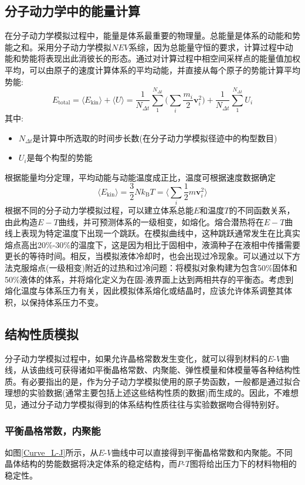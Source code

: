 \subsection{分子动力学中的能量计算}
在分子动力学模拟过程中，能量是体系最重要的物理量。总能量是体系的动能和势能之和。采用分子动力学模拟$NEV$系综，因为总能量守恒的要求，计算过程中动能和势能将表现出此消彼长的形态。通过对计算过程中相空间采样点的能量值加权平均，可以由原子的速度计算体系的平均动能，并直接从每个原子的势能计算平均势能:
\begin{equation}
	E_{\mathrm{total}}=\langle E_{\mathrm{kin}}\rangle+\langle U\rangle=\dfrac1{N_{\Delta t}}\sum_1^{N_{\Delta t}}\bigg(\sum_i\dfrac{m_i}2\mathbf{v}_i^2\bigg)+\dfrac1{N_{\Delta t}}\sum_1^{N_{\Delta t}}U_i
	\label{eq:MD_Enerty_tot}
\end{equation}
其中:
\begin{itemize}
	\item $N_{\Delta t}$是计算中所选取的时间步长数(在分子动力学模拟径迹中的构型数目)
	\item $U_i$是每个构型的势能
\end{itemize}
根据能量均分定理，平均动能与动能温度成正比，温度可根据速度数据确定
\begin{equation}
	\langle E_{\mathrm{kin}}\rangle=\dfrac32Nk_{\mathrm{B}}T=\bigg\langle\sum_i\dfrac12m\mathbf{v}_i^2\bigg\rangle
	\label{eq:Energy_T}
\end{equation}
根据不同的分子动力学模拟过程，可以建立体系总能$E$和温度$T$的不同函数关系，由此构造$E-T$曲线，并可预测体系的一级相变，如熔化。熔合潜热将在$E-T$曲线上表现为特定温度下出现一个跳跃。在模拟曲线中，这种跳跃通常发生在比真实熔点高出20\%-30\%的温度下，这是因为相比于固相中，液滴种子在液相中传播需要更长的等待时间。相反，当模拟液体冷却时，也会出现过冷现象。可以通过以下方法克服熔点(一级相变)附近的过热和过冷问题：将模拟对象构建为包含50\%固体和50\%液体的体系，并将熔化定义为在固-液界面上达到两相共存的平衡态。考虑到熔化温度与体系压力有关，因此模拟体系熔化或结晶时，应该允许体系调整其体积，以保持体系压力不变。
\subsection{结构性质模拟}
分子动力学模拟过程中，如果允许晶格常数发生变化，就可以得到材料的$E$-$V$曲线，从该曲线可获得诸如平衡晶格常数、内聚能、弹性模量和体模量等各种结构性质。有必要指出的是，作为分子动力学模拟使用的原子势函数，一般都是通过拟合理想的实验数据(通常主要包括上述这些结构性质的数据)而生成的。因此，不难想见，通过分子动力学模拟得到的体系结构性质往往与实验数据吻合得特别好。
\subsubsection{平衡晶格常数，内聚能}
如图\ref{Curve_L-J}所示，从$E$-$V$曲线中可以直接得到平衡晶格常数和内聚能。不同晶体结构的势能数据将决定体系的稳定结构，而$P$-$T$图将给出压力下的材料物相的稳定性。

